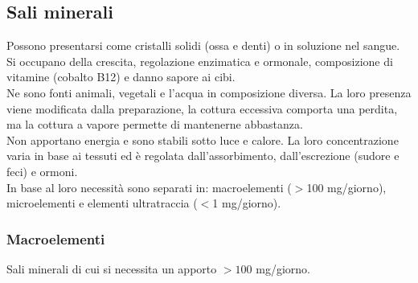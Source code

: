 \documentclass[10pt]{article}
\begin{document}
\subsection{Sali minerali}
Possono presentarsi come cristalli solidi (ossa e denti) o in soluzione nel sangue. Si occupano della crescita, regolazione enzimatica e ormonale, composizione di vitamine (cobalto B12) e danno sapore ai cibi.\\
Ne sono fonti animali, vegetali e l'acqua in composizione diversa. La loro presenza viene modificata dalla preparazione, la cottura eccessiva comporta una perdita, ma la cottura a vapore permette di mantenerne abbastanza.\\
Non apportano energia e sono stabili sotto luce e calore. La loro concentrazione varia in base ai tessuti ed è regolata dall'assorbimento, dall'escrezione (sudore e feci) e ormoni.\\
In base al loro necessità sono separati in: macroelementi ($>$100 mg/giorno), microelementi e elementi ultratraccia ($<$1 mg/giorno).
\subsubsection{Macroelementi}
Sali minerali di cui si necessita un apporto $>100$ mg/giorno.
\end{document}
